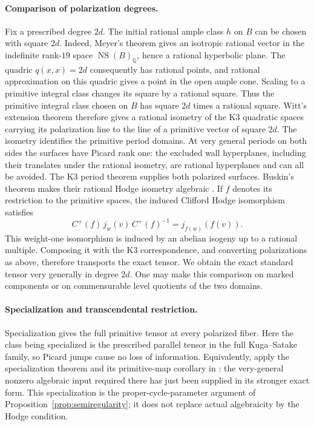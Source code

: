 \documentclass[11pt]{article}
\numberwithin{equation}{section}
\theoremstyle{definition}
\theoremstyle{remark}
\begin{document}
\paragraph{Comparison of polarization degrees.}
Fix a prescribed degree $2d$.  The initial rational ample
class $h$ on $B$ can be chosen with square $2d$.  Indeed,
Meyer's theorem gives an isotropic rational vector in the
indefinite rank-$19$ space $\operatorname{NS}(B)_{\mathbb Q}$, hence a rational
hyperbolic plane.  The quadric $q(x,x)=2d$ consequently has
rational points, and rational approximation on this quadric
gives a point in the open ample cone.  Scaling to a primitive
integral class changes its square by a rational square.
Thus the primitive integral class chosen on $B$ has square $2d$
times a rational square.  Witt's extension theorem
therefore gives a rational isometry of the K3 quadratic
spaces carrying its polarization line to the line of
a primitive vector of square $2d$.  The isometry
identifies the primitive period domains.  At very general
periods on both sides the surfaces have Picard rank one:
the excluded wall hyperplanes, including their translates
under the rational isometry, are rational hyperplanes
and can all be avoided.  The K3 period theorem supplies
both polarized surfaces.  Buskin's theorem makes their
rational Hodge isometry algebraic \cite{Buskin}.
If $f$ denotes its restriction to the primitive spaces,
the induced Clifford Hodge isomorphism satisfies
\[
 C^+(f)\,j_w(v)\,C^+(f)^{-1}
       =j_{f(w)}(f(v)).
\]
This weight-one isomorphism is induced by an abelian
isogeny up to a rational multiple.  Composing it with
the K3 correspondence, and converting polarizations
as above, therefore transports the exact tensor.
We obtain the exact standard tensor very generally in
degree $2d$.  One may make this comparison on marked
components or on commensurable level quotients of the
two domains.

\paragraph{Specialization and transcendental restriction.}
Specialization gives the full primitive tensor at
every polarized fiber.  Here the class being specialized
is the prescribed parallel tensor in the full
Kuga--Satake family, so Picard jumps cause no loss of
information.  Equivalently, apply the specialization
theorem and its primitive-map corollary in
\cite[Theorem~1.2 and Corollary~5.5]{CKS}: the very-general nonzero
algebraic input required there has just been supplied
in its stronger exact form.  This specialization is
the proper-cycle-parameter argument of
Proposition~\ref{prop:semiregularity}; it does not
replace actual algebraicity by the Hodge condition.
\end{document}
